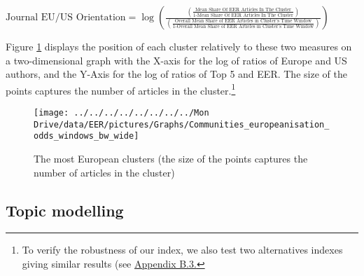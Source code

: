 \documentclass[
  12pt,
  onecolumn]{article}
\begin{document}
\bigskip

\({\scriptstyle \text{Journal EU/US Orientation}=\log(\frac{(\frac{\text{Mean Share Of EER Articles In The Cluster}}{\text{1-Mean Share Of EER Articles In The Cluster}})} {(\frac{\text{Overall Mean Share of EER Articles in Cluster's Time Window}}{\text{1-Overall Mean Share of EER Articles in Cluster's Time Window}})})}\)
\bigskip

Figure \ref{fig:plot-community-diff} displays the position of each
cluster relatively to these two measures on a two-dimensional graph with
the X-axis for the log of ratios of Europe and US authors, and the
Y-Axis for the log of ratios of Top 5 and EER. The size of the points
captures the number of articles in the cluster.\footnote{To verify the
  robustness of our index, we also test two alternatives indexes giving
  similar results (see \protect\hyperlink{alt-index}{Appendix B.3.}}

\begin{figure}[h]

{\centering \texttt{[image: ../../../../../../../../Mon Drive/data/EER/pictures/Graphs/Communities\_europeanisation\_odds\_windows\_bw\_wide]} 

}

\caption{The most European clusters (the size of the points captures the number of articles in the cluster)}\label{fig:plot-community-diff}
\end{figure}

\hypertarget{topic-modelling}{%
\subsection{Topic modelling}\label{topic-modelling}}
\end{document}
